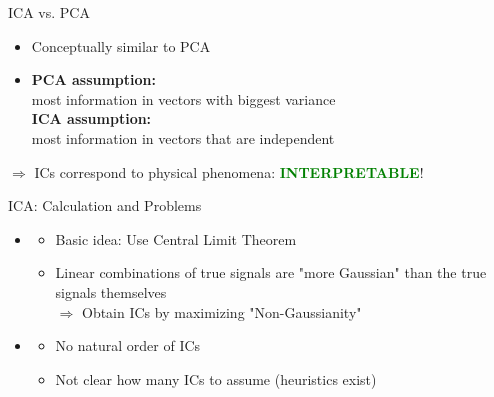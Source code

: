 \documentclass{beamer}
\begin{document}
\begin{frame}{ICA vs. PCA}
	\begin{itemize}
		\item Conceptually similar to PCA \pause
		\item \textbf{PCA assumption:}\\
			most information in vectors with biggest variance\\ \pause
			\textbf{ICA assumption:}\\
			most information in vectors that are independent \pause
	\end{itemize}
	$\Rightarrow$ ICs correspond to physical phenomena: \textbf{\textcolor{green}{INTERPRETABLE}}!
\end{frame}

\begin{frame}{ICA: Calculation and Problems}
	\begin{itemize}
		\item {}
			\begin{itemize}[label=-]
				\item Basic idea: Use Central Limit Theorem \pause
				\item Linear combinations of true signals are "more Gaussian" than the true signals themselves\\ \pause
					$\Rightarrow$ Obtain ICs by maximizing "Non-Gaussianity" \pause
			\end{itemize}
		\item {} \pause
			\begin{itemize}[label=\negativeaspect]
				\item No natural order of ICs \pause
				\item Not clear how many ICs to assume (heuristics exist)
			\end{itemize}
	\end{itemize}
\end{frame}
\end{document}
